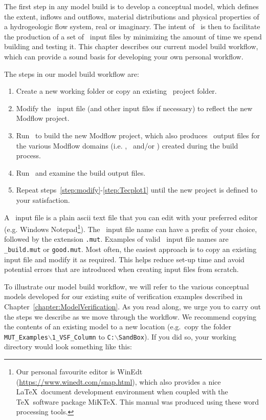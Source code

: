 \label{chapter:ModelBuild}
The first step in any model build is to develop a conceptual model, which defines the extent, inflows and outflows, material distributions and physical properties of a hydrogeologic flow system, real or imaginary. The intent of \mut\ is then to facilitate the production of a set of \mfus\ input files by minimizing the amount of time we spend building and testing it.  This chapter describes our current model build workflow, which can provide a sound basis for developing your own personal workflow.

The steps in our model build workflow are:
\begin{enumerate}
    \item Create a new working folder or copy an existing \mut\ project folder. \label{step:copy}
    \item Modify the \mut\ input file (and other input files if necessary) to reflect the new Modflow project.\label{step:modify}
    \item Run \mut\ to build the new Modflow project, which also produces \tecplot\ output files for the various Modflow domains (i.e. \gwf, \swf\ and/or \cln ) created during the build process. \label{step:mut1}
    \item Run \tecplot\ and examine the build output files.   \label{step:Tecplot1}
    \item Repeat steps~\ref{step:modify}-\ref{step:Tecplot1} until the new project is defined to your satisfaction.
\end{enumerate}

A \mut\ input file is a plain ascii text file that you can edit with your preferred editor (e.g. Windows Notepad\footnote{Our personal favourite editor is WinEdt (\url{https://www.winedt.com/snap.html}), which also provides a nice \LaTeX\ document development environment when coupled with the \TeX\ software package MiKTeX.  This manual was produced using these word processing tools.}).
The \mut\ input file name can have a prefix of your choice, followed by the extension \texttt{.mut}. Examples of valid \mut\ input file names are \texttt{\_build.mut} or \texttt{good.mut}. Most often, the easiest approach is to copy an existing input file and modify it as required.  This helps reduce set-up time and avoid potential errors that are introduced when creating input files from scratch.

To illustrate our model build workflow, we will refer to the various conceptual models developed for our existing suite of verification examples described in  Chapter~\ref{chapter:ModelVerification}.  As you read along, we urge you to carry out the steps we describe as we move through the workflow.  We recommend copying the contents of an existing model to a new location (e.g.\ copy the folder \texttt{MUT\_Examples$\backslash$1\_VSF\_Column} to \texttt{C:$\backslash$SandBox}).  If you did so, your working directory would look something like this:

